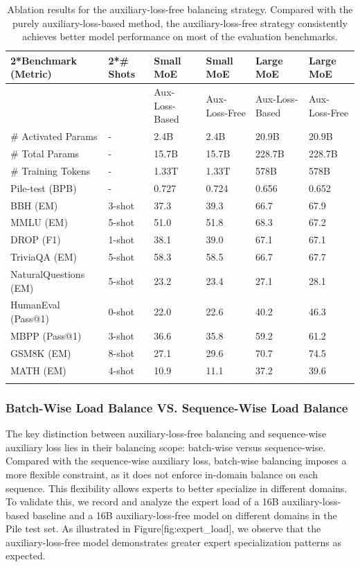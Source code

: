 \documentclass[11pt,a4paper]{article}
\begin{document}
\begin{table}[h]
\caption{Ablation results for the auxiliary-loss-free balancing strategy. Compared with the purely auxiliary-loss-based method, the auxiliary-loss-free strategy consistently achieves better model performance on most of the evaluation benchmarks.}
\begin{tabular}{|l|l|l|l|l|l|}
\hline
2*Benchmark (Metric) & 2*\# Shots & Small MoE & Small MoE & Large MoE & Large MoE \\ \hline
 &  & Aux-Loss-Based & Aux-Loss-Free & Aux-Loss-Based & Aux-Loss-Free \\ \hline
\# Activated Params & - & 2.4B & 2.4B & 20.9B & 20.9B \\ \hline
\# Total Params & - & 15.7B & 15.7B & 228.7B & 228.7B \\ \hline
\# Training Tokens & - & 1.33T & 1.33T & 578B & 578B \\ \hline
Pile-test (BPB) & - & 0.727 & 0.724 & 0.656 & 0.652 \\ \hline
BBH (EM) & 3-shot & 37.3 & 39.3 & 66.7 & 67.9 \\ \hline
MMLU (EM) & 5-shot & 51.0 & 51.8 & 68.3 & 67.2 \\ \hline
DROP (F1) & 1-shot & 38.1 & 39.0 & 67.1 & 67.1 \\ \hline
TriviaQA (EM) & 5-shot & 58.3 & 58.5 & 66.7 & 67.7 \\ \hline
NaturalQuestions (EM) & 5-shot & 23.2 & 23.4 & 27.1 & 28.1 \\ \hline
HumanEval (Pass@1) & 0-shot & 22.0 & 22.6 & 40.2 & 46.3 \\ \hline
MBPP (Pass@1) & 3-shot & 36.6 & 35.8 & 59.2 & 61.2 \\ \hline
GSM8K (EM) & 8-shot & 27.1 & 29.6 & 70.7 & 74.5 \\ \hline
MATH (EM) & 4-shot & 10.9 & 11.1 & 37.2 & 39.6 \\ \hline
 &  &  &  &  &  \\ \hline
\end{tabular}
\end{table}

\subsubsection{Batch-Wise Load Balance VS. Sequence-Wise Load Balance}

The key distinction between auxiliary-loss-free balancing and sequence-wise auxiliary loss lies in their balancing scope: batch-wise versus sequence-wise. Compared with the sequence-wise auxiliary loss, batch-wise balancing imposes a more flexible constraint, as it does not enforce in-domain balance on each sequence. This flexibility allows experts to better specialize in different domains. To validate this, we record and analyze the expert load of a 16B auxiliary-loss-based baseline and a 16B auxiliary-loss-free model on different domains in the Pile test set. As illustrated in Figure[fig:expert\_load], we observe that the auxiliary-loss-free model demonstrates greater expert specialization patterns as expected.
\end{document}
